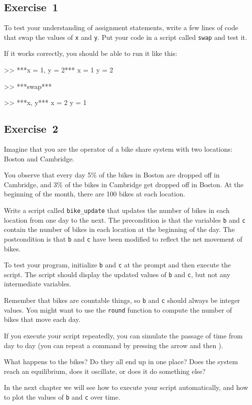\subsection{Exercise~1}
To test your understanding of assignment statements, write a few lines of code that swap the values of \lstinline{x} and \lstinline{y}. 
Put your code in a script called \lstinline{swap} and test it.

If it works correctly, you should be able to run it like this:

\begin{code}
>> ***x = 1, y = 2***
x = 1
y = 2

>> ***swap***

>> ***x, y***
x = 2
y = 1
\end{code}





\subsection{Exercise~2}
\label{bikegame}

Imagine that you are the operator of a bike share system with two
locations: Boston and Cambridge.

You observe that every day 5\%
of the bikes in Boston are dropped off in Cambridge, and 3\% of the bikes
in Cambridge get dropped off in Boston.
At the beginning of the month, there are 100 bikes at each location.

Write a script called \lstinline{bike_update} that updates the number
of bikes in each location from one day to the next.  The precondition
is that the variables \lstinline{b} and \lstinline{c} contain the number of bikes
in each location at the beginning of the day.  The postcondition
is that \lstinline{b} and \lstinline{c} have been modified to reflect the net movement of bikes.

To test your program, initialize \lstinline{b} and \lstinline{c} at
the prompt and then execute the script.  The script should display
the updated values of \lstinline{b} and \lstinline{c}, but not any intermediate
variables.

Remember that bikes are countable things, so \lstinline{b} and \lstinline{c} should always be integer values.  You might want to use the \lstinline{round} function
to compute the number of bikes that move each day.

If you execute your script repeatedly, you can simulate the passage
of time from day to day (you can repeat a command by pressing the  arrow and then ).

What happens to the bikes?  Do they all end up in one place?  Does the system reach an equilibrium, does it oscillate, or does it do something else?

In the next chapter we will see how to execute your script automatically,
and how to plot the values of \lstinline{b} and \lstinline{c} over time.


